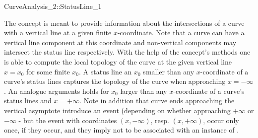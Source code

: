 \begin{ccRefConcept}{CurveAnalysis_2::StatusLine_1}

\ccDefinition

The  concept is meant to provide information
about the intersections of a curve with a vertical line at a given 
finite $x$-coordinate. Note that a curve can have a vertical line component 
at this coordinate and non-vertical components may intersect 
the status line respectively. 
With the help of the concept's methods one is able
to compute the local topology of the curve 
at the given vertical line $x = x_0$ for some finite $x_0$.
A status line an $x_0$ smaller than any $x$-coordinate of a curve's 
status lines captures the topology of the curve when approaching $x = -\infty$.
An analogue arguments holds for $x_0$ larger than any $x$-coordinate
of a curve's status lines and $x = +\infty$.
Note in addition that curve ends approaching the vertical asymptote 
introduce an event (depending on whether approaching $+\infty$ or $-\infty$ -
but the event with coordinates $(x,-\infty)$, resp. $(x,+\infty)$, occur
only once, if they occur, and they imply not to be associated with
an instance of .

\ccTypes




\ccAccessFunctions





\end{ccRefConcept}
